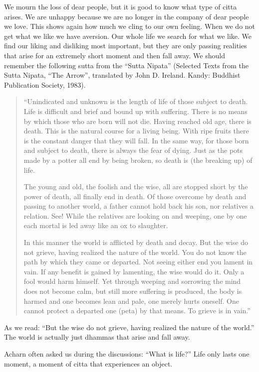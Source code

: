 \documentclass{book}
\begin{document}
We mourn the loss of
dear people, but it is good to know what type of citta arises. We are
unhappy because we are no longer in the company of dear
people we
love. This shows again how
much we cling to our own feeling. When we do not get what we like we
have aversion. Our whole life we search for what we like. We
find our liking and
disliking most important, but they are only passing
realities that arise for an extremely short moment and then fall away.
We should remember the following sutta from
the ``Sutta
Nipata'' (Selected Texts from the Sutta Nipata,
``The Arrow'', translated by
John D. Ireland. Kandy:
Buddhist Publication Society, 1983).

\begin{quote}
``Unindicated and unknown is the length
of life of those subject to death. Life
is difficult and brief and bound up with
suffering. There is no means by which
those who are born will not die. Having
reached old age, there is death. This is
the natural course for a living being.
With ripe fruits there is the constant
danger that they will fall. In the same
way, for those born and subject to
death, there is always the fear of
dying. Just as the pots made by a potter all
end by being broken, so death is (the
breaking up) of life.

The young and old, the foolish and the
wise, all are stopped short by the power
of death, all finally end in death. Of
those overcome by death and passing to
another world, a father cannot hold back
his son, nor relatives a relation. See!
While the relatives are looking on and
weeping, one by one each mortal is led
away like an ox to slaughter.

In this manner the world is afflicted
by death and decay. But the wise do not
grieve, having realized the nature of
the world. You do not know the path by
which they came or departed. Not seeing
either end you lament in vain. If any
benefit is gained by lamenting, the wise
would do it. Only a fool would harm
himself. Yet through weeping and
sorrowing the mind does not become calm, but
still more suffering is produced, the
body is harmed and one becomes lean and
pale, one merely hurts oneself. One
cannot protect a departed one (peta) by that
means. To grieve is in
vain.''
\end{quote}

As we read: ``But the wise do not
grieve, having realized the nature of
the world.'' The world is actually just dhammas that arise
and fall away. 

Acharn often asked us during the
discussions: ``What is life?'' Life only lasts one moment, a moment of
citta that experiences an object.
\end{document}
